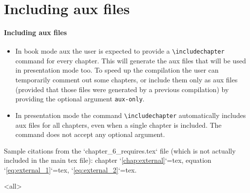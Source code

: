 \setcounter{chapter}{5}
\chapter{Including aux files}
\label{chap:including_aux_files}

\begin{frame}[fragile]
\frametitle{Including aux files}

\begin{itemize}
\item In book mode aux the user is expected to provide a \verb|\includechapter| command for every chapter. This will generate the aux files that will be used in presentation mode too. To speed up the compilation the user can temporarily comment out some chapters, or include them only as aux files (provided that those files were generated by a previous compilation) by providing the optional argument \verb|aux-only|.
\item In presentation mode the command \verb|\includechapter| automatically includes aux files for all chapters, even when a single chapter is included. The command does not accept any optional argument.
\end{itemize}

\mode*
\begin{mdcell}
Sample citations from the `chapter_6_requires.tex` file (which is not actually included in the main tex file): chapter `\ref{chap:external}`{=tex}, equation `\ref{eq:external_1}`{=tex}, `\eqref{eq:external_2}`{=tex}.
\end{mdcell}
\mode<all>
\end{frame}

